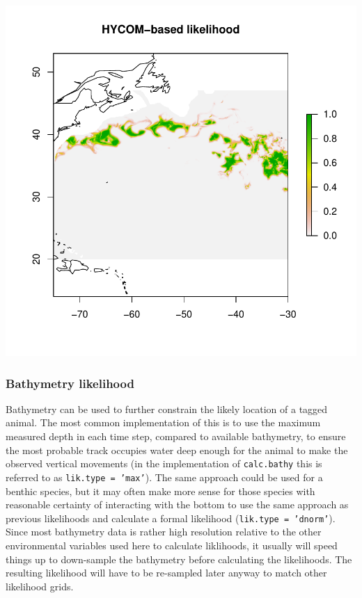 \documentclass{article}\usepackage[]{graphicx}\usepackage[]{color}
\makeatletter
\def\maxwidth{ %
  \ifdim\Gin@nat@width>\linewidth
    \linewidth
  \else
    \Gin@nat@width
  \fi
}
\newenvironment{knitrout}{}{} %
\makeatother
\begin{document}
\begin{knitrout}
\includegraphics[width=\maxwidth]{figure/lik-pdt-plot-2} 

\end{knitrout}

\subsubsection{Bathymetry likelihood}

Bathymetry can be used to further constrain the likely location of a tagged animal. The most common implementation of this is to use the maximum measured depth in each time step, compared to available bathymetry, to ensure the most probable track occupies water deep enough for the animal to make the observed vertical movements (in the implementation of \texttt{calc.bathy} this is referred to as \texttt{lik.type = 'max'}). The same approach could be used for a benthic species, but it may often make more sense for those species with reasonable certainty of interacting with the bottom to use the same approach as previous likelihoods and calculate a formal likelihood (\texttt{lik.type = 'dnorm'}). Since most bathymetry data is rather high resolution relative to the other environmental variables used here to calculate liklihoods, it usually will speed things up to down-sample the bathymetry before calculating the likelihoods. The resulting likelihood will have to be re-sampled later anyway to match other likelihood grids.
\end{document}
